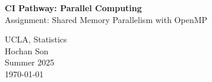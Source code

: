\documentclass[11pt]{article}
\begin{document}





\newif\ifuselocaldir
\uselocaldirtrue
\uselocaldirfalse


\newcommand{\DXZ}{
\begin{flushright}
\vspace{-.4in}
 { \raisebox{0.30ex}{{\tiny D}}\hspace{0.008in}X\hspace{0.01in}\raisebox{0.30ex}{{\tiny Z}}     }
\end{flushright}
}


\newenvironment{myQuote}[2]%
               {\begin{list}{}{\leftmargin#1\rightmargin#2}\item{}}%
               {\end{list}}

\begin{myQuote}{2cm}{2cm}
\begin{center}
{\huge
\textbf{CI Pathway: Parallel Computing} \\[0.4cm]
Assignment: Shared Memory Parallelism with OpenMP
} \\[0.4cm]
\end{center}
\end{myQuote}




\begin{myQuote}{3cm}{3cm}
{\normalsize
\begin{center}
UCLA, Statistics\\Hochan Son\\Summer 2025\\
\today
\end{center}
}
\end{myQuote}


\end{document}
